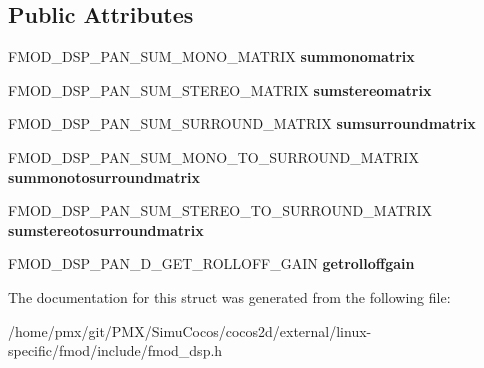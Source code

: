 \subsection*{Public Attributes}
\begin{DoxyCompactItemize}
\item 
\mbox{\label{structFMOD__DSP__STATE__PAN__CALLBACKS_ad143c58fe76841fdd2df55dfb97e8bcf}} 
F\+M\+O\+D\+\_\+\+D\+S\+P\+\_\+\+P\+A\+N\+\_\+\+S\+U\+M\+\_\+\+M\+O\+N\+O\+\_\+\+M\+A\+T\+R\+IX {\bfseries summonomatrix}
\item 
\mbox{\label{structFMOD__DSP__STATE__PAN__CALLBACKS_ab9e8eaad1ee1bb9b37f308868c508d72}} 
F\+M\+O\+D\+\_\+\+D\+S\+P\+\_\+\+P\+A\+N\+\_\+\+S\+U\+M\+\_\+\+S\+T\+E\+R\+E\+O\+\_\+\+M\+A\+T\+R\+IX {\bfseries sumstereomatrix}
\item 
\mbox{\label{structFMOD__DSP__STATE__PAN__CALLBACKS_a4e94bf1943c30e5cd3e2abe6af3efbd1}} 
F\+M\+O\+D\+\_\+\+D\+S\+P\+\_\+\+P\+A\+N\+\_\+\+S\+U\+M\+\_\+\+S\+U\+R\+R\+O\+U\+N\+D\+\_\+\+M\+A\+T\+R\+IX {\bfseries sumsurroundmatrix}
\item 
\mbox{\label{structFMOD__DSP__STATE__PAN__CALLBACKS_a311e7c1320d4794c0183c0416ec02951}} 
F\+M\+O\+D\+\_\+\+D\+S\+P\+\_\+\+P\+A\+N\+\_\+\+S\+U\+M\+\_\+\+M\+O\+N\+O\+\_\+\+T\+O\+\_\+\+S\+U\+R\+R\+O\+U\+N\+D\+\_\+\+M\+A\+T\+R\+IX {\bfseries summonotosurroundmatrix}
\item 
\mbox{\label{structFMOD__DSP__STATE__PAN__CALLBACKS_ab82c611425244c8312546d4b9f229818}} 
F\+M\+O\+D\+\_\+\+D\+S\+P\+\_\+\+P\+A\+N\+\_\+\+S\+U\+M\+\_\+\+S\+T\+E\+R\+E\+O\+\_\+\+T\+O\+\_\+\+S\+U\+R\+R\+O\+U\+N\+D\+\_\+\+M\+A\+T\+R\+IX {\bfseries sumstereotosurroundmatrix}
\item 
\mbox{\label{structFMOD__DSP__STATE__PAN__CALLBACKS_abc90a68ed8513db35456d8a6620b163c}} 
F\+M\+O\+D\+\_\+\+D\+S\+P\+\_\+\+P\+A\+N\+\_\+D\+\_\+\+G\+E\+T\+\_\+\+R\+O\+L\+L\+O\+F\+F\+\_\+\+G\+A\+IN {\bfseries getrolloffgain}
\end{DoxyCompactItemize}


The documentation for this struct was generated from the following file\+:\begin{DoxyCompactItemize}
\item 
/home/pmx/git/\+P\+M\+X/\+Simu\+Cocos/cocos2d/external/linux-\/specific/fmod/include/fmod\+\_\+dsp.\+h\end{DoxyCompactItemize}

